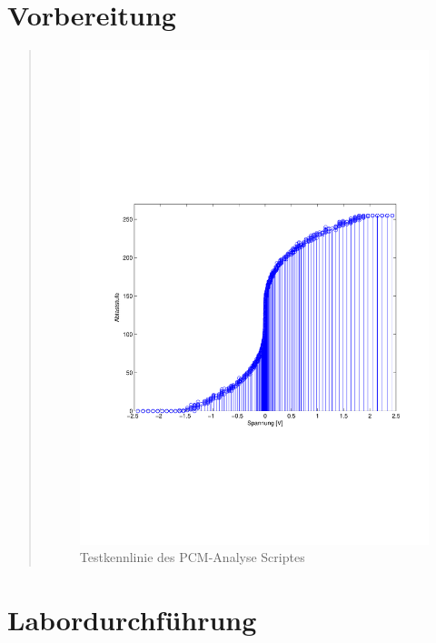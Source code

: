 \section{Vorbereitung}
\begin{quote}
    
    
    \begin{figure}[H]
        \centering
        \includegraphics[scale=0.7, trim = 2cm 7cm 1cm 8cm, clip]{Bilder/PCM_Test}
        \caption{Testkennlinie des PCM-Analyse Scriptes}
        \label{fig:PCM_Test}
    \end{figure}
    
    
    
    
    
    
\end{quote}


\section{Labordurchführung}

